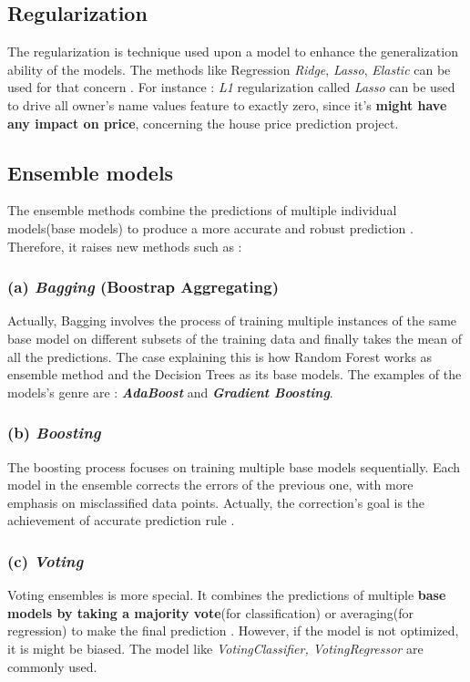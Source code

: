 \documentclass[12pt,a4paper]{report}
\begin{document}
\subsection*{Regularization} 
The regularization is technique used upon a model to enhance the generalization ability of the models. The methods like Regression \textit{Ridge}, \textit{Lasso},  \textit{Elastic} can be used for that concern \cite{mlwithpython}.  For instance : \textit{L1} regularization called \textit{Lasso} can be used to drive all  owner's name values feature to exactly zero, since it's \textbf{might have any impact on price}, concerning the house price prediction project.
\subsection*{Ensemble models}
The ensemble methods combine the predictions of multiple individual models(base models) to produce a more accurate and robust prediction \cite{kabari2019comparison}. Therefore, it raises new methods such as :
\subsubsection{(a) \textit{Bagging} (Boostrap Aggregating)} 
Actually, Bagging involves the process of training multiple instances of the same base model on different subsets of the training data and finally takes the mean of all the predictions. The case explaining this is how Random Forest works as ensemble method and the Decision Trees as its base models. The examples of the models's genre are : \textbf{\textit{AdaBoost}} and \textbf{\textit{Gradient Boosting}}.
\subsubsection{(b) \textit{Boosting}} 
The boosting process focuses on training multiple base models sequentially. Each model in the ensemble corrects the errors of the previous one, with more emphasis on misclassified data points. Actually, the correction's goal is the achievement of accurate prediction rule \cite{praveena2017literature}.

\subsubsection{(c) \textit{Voting}} 
Voting ensembles is more special. It combines the predictions of multiple \textbf{base models by taking a majority vote}(for classification) or averaging(for regression) to make the final prediction \cite{kabari2019comparison}. However, if the model is not optimized, it is might be biased. The model like \textit{VotingClassifier, VotingRegressor} are commonly used. 
\end{document}
